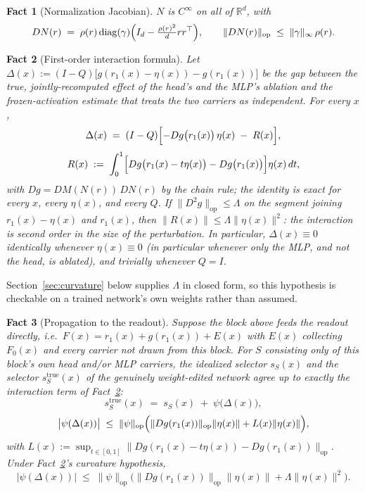 \documentclass[11pt,a4paper]{article}
\newtheorem{fact}{Fact}
\begin{document}
\begin{fact}[Normalization Jacobian]
\label{lem:jacobian}
$N$ is $C^\infty$ on all of $\mathbb R^d$, with
\[
DN(r) \;=\; \rho(r)\operatorname{diag}(\gamma)
\Bigl(I_d - \tfrac{\rho(r)^2}{d}rr^\top\Bigr),
\qquad
\|DN(r)\|_{\mathrm{op}} \;\le\; \|\gamma\|_\infty\,\rho(r).
\]
\end{fact}

\begin{fact}[First-order interaction formula]
\label{thm:interaction}
Let $\Delta(x):=(I-Q)\bigl[g(r_1(x)-\eta(x))-g(r_1(x))\bigr]$ be the gap
between the true, jointly-recomputed effect of the head's and the MLP's
ablation and the frozen-activation estimate that treats the two carriers as
independent. For every $x$,
\[
\Delta(x) \;=\; (I-Q)\Bigl[-Dg\bigl(r_1(x)\bigr)\,\eta(x) \;-\; R(x)\Bigr],
\]
\[
R(x) \;:=\; \int_0^1\Bigl[Dg\bigl(r_1(x)-t\eta(x)\bigr)-Dg\bigl(r_1(x)\bigr)\Bigr]\eta(x)\,dt,
\]
with $Dg=DM(N(r))\,DN(r)$ by the chain rule; the identity is exact for every
$x$, every $\eta(x)$, and every $Q$. If $\|D^2g\|_{\mathrm{op}}\le\Lambda$ on
the segment joining $r_1(x)-\eta(x)$ and $r_1(x)$, then
$\|R(x)\|\le\Lambda\|\eta(x)\|^2$: the interaction is second order in the
size of the perturbation. In particular, $\Delta(x)\equiv0$ identically
whenever $\eta(x)\equiv0$ (in particular whenever only the MLP, and not the
head, is ablated), and trivially whenever $Q=I$.
\end{fact}

Section~\ref{sec:curvature} below supplies $\Lambda$ in closed form, so
this hypothesis is checkable on a trained network's own weights rather than
assumed.

\begin{fact}[Propagation to the readout]
\label{prop:readout}
Suppose the block above feeds the readout directly, i.e.\
$F(x)=r_1(x)+g(r_1(x))+E(x)$ with $E(x)$ collecting $F_0(x)$ and every
carrier not drawn from this block. For $S$ consisting only of this block's
own head and/or MLP carriers, the idealized selector $s_S(x)$ and the
selector $s_S^{\mathrm{true}}(x)$ of the genuinely weight-edited network
agree up to exactly the interaction term of
Fact~\ref{thm:interaction}:
\[
s_S^{\mathrm{true}}(x) \;=\; s_S(x) \;+\; \psi\bigl(\Delta(x)\bigr),
\]
\[
\bigl|\psi(\Delta(x))\bigr| \;\le\; \|\psi\|_{\mathrm{op}}\Bigl(\|Dg(r_1(x))\|_{\mathrm{op}}\|\eta(x)\|+L(x)\|\eta(x)\|\Bigr),
\]
with $L(x):=\sup_{t\in[0,1]}\|Dg(r_1(x)-t\eta(x))-Dg(r_1(x))\|_{\mathrm{op}}$.
Under Fact~\ref{thm:interaction}'s curvature hypothesis,
\[
\bigl|\psi(\Delta(x))\bigr|\;\le\;\|\psi\|_{\mathrm{op}}\bigl(\|Dg(r_1(x))\|_{\mathrm{op}}\|\eta(x)\|+\Lambda\|\eta(x)\|^2\bigr).
\]
\end{fact}
\end{document}

